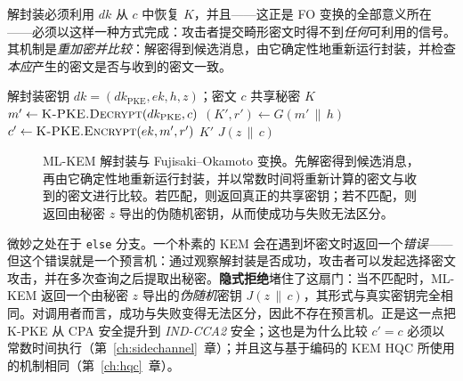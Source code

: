 解封装必须利用 $dk$ 从 $c$ 中恢复 $K$，并且——这正是 FO 变换的全部意义所在——必须以这样一种方式完成：攻击者提交畸形密文时得不到\emph{任何}可利用的信号。其机制是\emph{重加密并比较}：解密得到候选消息，由它确定性地重新运行封装，并检查\emph{本应}产生的密文是否与收到的密文一致。

\begin{algorithm}[H]
\caption{ML-KEM.Decaps（教学形式）}
\label{alg:mlkem-decaps}
\begin{algorithmic}[1]
\Require 解封装密钥 $dk=(dk_{\mathrm{PKE}}, ek, h, z)$；密文 $c$
\Ensure 共享秘密 $K$
\State $m' \gets \textsc{K-PKE.Decrypt}(dk_{\mathrm{PKE}}, c)$
\State $(K', r') \gets G(m' \,\|\, h)$
\State $c' \gets \textsc{K-PKE.Encrypt}(ek, m', r')$ 
  \State \Return $K'$ 
\Else
  \State \Return $J(z \,\|\, c)$ 
\EndIf
\end{algorithmic}
\end{algorithm}

\begin{figure}[H]
\centering
{}
\caption{ML-KEM 解封装与 Fujisaki--Okamoto 变换。先解密得到候选消息，再由它确定性地重新运行封装，并以常数时间将重新计算的密文与收到的密文进行比较。若匹配，则返回真正的共享密钥；若不匹配，则返回由秘密 $z$ 导出的伪随机密钥，从而使成功与失败无法区分。}
\label{fig:mlkem-fo}
\end{figure}

微妙之处在于 \texttt{else} 分支。一个朴素的 KEM 会在遇到坏密文时返回一个\emph{错误}——但这个错误就是一个预言机：通过观察解封装是否成功，攻击者可以发起选择密文攻击，并在多次查询之后提取出秘密。\textbf{隐式拒绝}堵住了这扇门：当不匹配时，ML-KEM 返回一个由秘密 $z$ 导出的\emph{伪随机}密钥 $J(z\,\|\,c)$，其形式与真实密钥完全相同。对调用者而言，成功与失败变得无法区分，因此不存在预言机。正是这一点把 K-PKE 从 CPA 安全提升到 \emph{IND-CCA2} 安全；这也是为什么比较 $c'=c$ 必须以常数时间执行（第~\ref{ch:sidechannel}~章）；并且这与基于编码的 KEM HQC 所使用的机制相同（第~\ref{ch:hqc}~章）。

